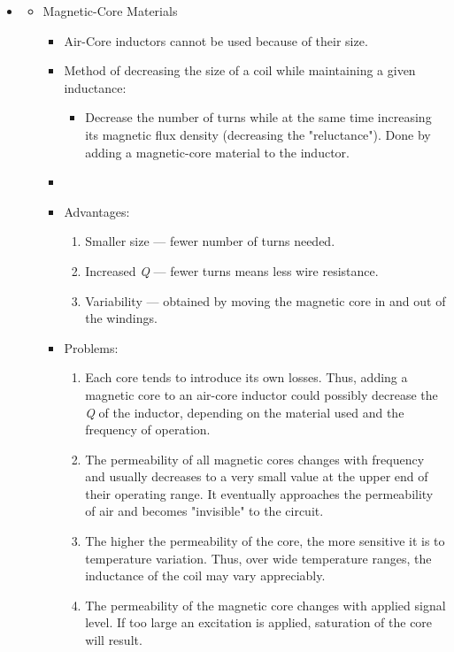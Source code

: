 \begin{itemize}
	\item[] 
	\begin{itemize}
		\item Magnetic-Core Materials
		\begin{itemize}
			\item Air-Core inductors cannot be used because of their size.
			\item Method of decreasing the size of a coil while maintaining a given inductance:
			\begin{itemize}
				\item Decrease the number of turns while at the same time increasing its magnetic flux density (decreasing the
				"reluctance"). Done by adding a magnetic-core material to the inductor.
			\end{itemize}
			\item[]
			\item Advantages:
			\begin{enumerate}
				\item Smaller size — fewer number of turns needed.
				\item Increased \textit{Q} — fewer turns means less wire resistance.
				\item Variability — obtained by moving the magnetic core in
				and out of the windings.
			\end{enumerate}
			
			\newpage\item Problems:
			\begin{enumerate}
				\item Each core tends to introduce its own losses. Thus, adding
				a magnetic core to an air-core inductor could possibly
				decrease the \textit{Q} of the inductor, depending on the material used and the frequency of operation.
				\item The permeability of all magnetic cores changes with
				frequency and usually decreases to a very small value at
				the upper end of their operating range. It eventually
				approaches the permeability of air and becomes
				"invisible" to the circuit.
				\item The higher the permeability of the core, the more
				sensitive it is to temperature variation. Thus, over wide
				temperature ranges, the inductance of the coil may vary
				appreciably.
				\item The permeability of the magnetic core changes with
				applied signal level. If too large an excitation is applied,
				saturation of the core will result.
			\end{enumerate}
		\end{itemize}
	\end{itemize}
\end{itemize}

